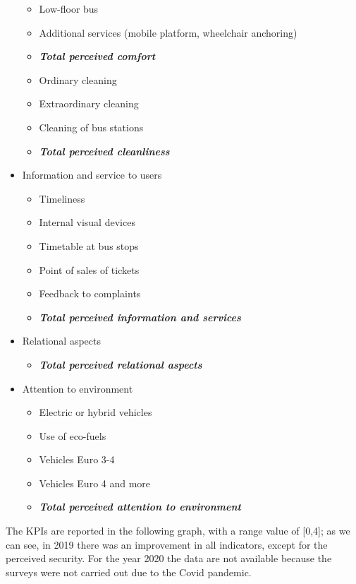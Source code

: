 \begin{itemize}
\begin{itemize}
        \item Low-floor bus
        \item Additional services (mobile platform, wheelchair anchoring)
        \item \textit{\textbf{Total perceived comfort}}
        \item Ordinary cleaning
        \item Extraordinary cleaning
        \item Cleaning of bus stations
        \item \textit{\textbf{Total perceived cleanliness}}
    \end{itemize}
    \item Information and service to users
    \begin{itemize}
        \item Timeliness
        \item Internal visual devices
        \item Timetable at bus stops
        \item Point of sales of tickets
        \item Feedback to complaints
        \item \textit{\textbf{Total perceived information and services}}
    \end{itemize}
    \item Relational aspects
        \begin{itemize}
            \item  \textit{\textbf{Total perceived relational aspects}}
        \end{itemize}
    \item Attention to environment
        \begin{itemize}
            \item Electric or hybrid vehicles 
            \item Use of eco-fuels
            \item Vehicles Euro 3-4
            \item Vehicles Euro 4 and more
            \item \textit{\textbf{Total perceived attention to environment}}
        \end{itemize}
\end{itemize}

The KPIs are reported in the following graph, with a range value of [0,4]; as we can see, in 2019 there was an improvement in all indicators, except for the perceived security. For the year 2020 the data are not available because the surveys were not carried out due to the Covid pandemic.

